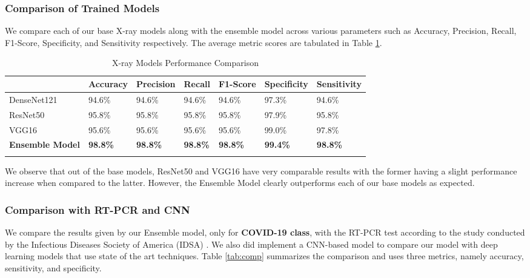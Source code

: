 \subsubsection{Comparison of Trained Models}

We compare each of our base X-ray models along with the ensemble model across various parameters such as Accuracy, Precision, Recall, F1-Score, Specificity, and Sensitivity respectively. The average metric scores are tabulated in Table \ref{tab:mpcXray}.

\vspace{1em}
 \begin{longtable}{| p{} |  p{} |   p{} | p{} | p{} | p{} | p{} |} 
    \hline
& \textbf{Accuracy} & \textbf{Precision} & \textbf{Recall} & \textbf{F1-Score} & \textbf{Specificity} & \textbf{Sensitivity} \\
\hline
			DenseNet121    &94.6\%   &94.6\%    &94.6\%    &94.6\%   &97.3\%   &94.6\% 
\\\hline
			ResNet50    &95.8\%   &95.8\%    &95.8\%    &95.8\%   &97.9\%   &95.8\% 
\\\hline
			VGG16    &95.6\%   &95.6\%    &95.6\%    &95.6\%   &99.0\%   &97.8\% 
\\\hline
	        \textbf{Ensemble Model}    &\textbf{98.8\%}   &\textbf{98.8\%}    &\textbf{98.8\%}    &\textbf{98.8\%}   &\textbf{99.4\%}   &\textbf{98.8\%} 
\\\hline
 \caption{X-ray Models Performance Comparison}  \label{tab:mpcXray}

    \end{longtable}
\vspace{-1em}
We observe that out of the base models, ResNet50 and VGG16 have very comparable results with the former having a slight performance increase when compared to the latter. However, the Ensemble Model clearly outperforms each of our base models as expected.

\subsubsection{Comparison with RT-PCR and CNN}

We compare the results given by our Ensemble model, only for \textbf{COVID-19 class}, with the RT-PCR test according to the study conducted by the Infectious Diseases Society of America (IDSA) \cite{IDS2020}. We also did implement a CNN-based model to compare our model with deep learning models that use state of the art techniques.
Table \ref{tab:comp} summarizes the comparison and uses three metrics, namely accuracy, sensitivity, and specificity. 

